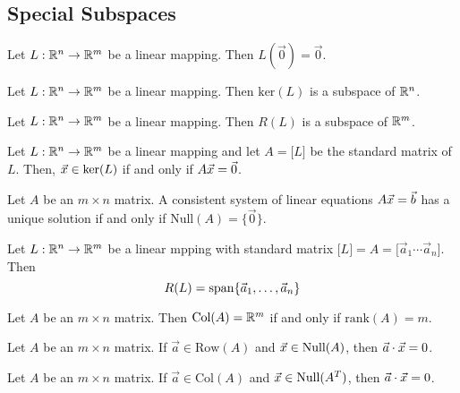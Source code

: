 \documentclass[english,12pt]{article}
\begin{document}
\subsection{Special Subspaces}

\begin{thrm}
Let $L:{\mathbb{R}}^n \rightarrow {\mathbb{R}}^m$ be a linear mapping. Then $L(\vec{0}) = \vec{0}$.
\end{thrm}

\begin{thrm}
Let $L: {\mathbb{R}}^n \rightarrow {\mathbb{R}}^m$ be a linear mapping. Then $\text{ker}(L)$ is a subspace of ${\mathbb{R}}^n$.
\end{thrm}

\begin{thrm}
Let $L: {\mathbb{R}}^n \rightarrow {\mathbb{R}}^m$ be a linear mapping. Then $R(L)$ is a subspace of ${\mathbb{R}}^m$.
\end{thrm}

\begin{thrm}
Let $L: {\mathbb{R}}^n\rightarrow{\mathbb{R}}^m$ be a linear mapping and let $A = \lbrack L \rbrack$ be the standard matrix of $L$. Then, $\vec{x} \in \text{ker}(L)$ if and only if $A\vec{x} = \vec{0}$.
\end{thrm}

\begin{thrm}
Let $A$ be an $m \times n$ matrix. A consistent system of linear equations $A\vec{x} = \vec{b}$ has a unique solution if and only if $\text{Null}(A) = \{\vec{0}\}$.
\end{thrm}

\begin{thrm}
Let $L:{\mathbb{R}}^n \rightarrow {\mathbb{R}}^m$ be a linear mpping with standard matrix $\lbrack L \rbrack = A = \lbrack \vec{a}_{1} \cdots \vec{a}_{n} \rbrack$. Then
\[R(L) = \operatorname{span}\{\vec{a}_{1},\dots,\vec{a}_{n}\}\]
\end{thrm}

\begin{thrm}
Let $A$ be an $m \times n$ matrix. Then $\text{Col}(A) = {\mathbb{R}}^m$ if and only if $\text{rank}(A) = m$.
\end{thrm}

\begin{thrm}
Let $A$ be an $m \times n$ matrix. If $\vec{a} \in \text{Row}(A)$ and $\vec{x} \in \text{Null}(A)$, then $\vec{a} \cdot \vec{x} = 0$.
\end{thrm}

\begin{thrm}
Let $A$ be an $m \times n$ matrix. If $\vec{a} \in \text{Col}(A)$ and $\vec{x} \in \text{Null}(A^T)$, then $\vec{a} \cdot \vec{x} = 0$.
\end{thrm}
\end{document}
